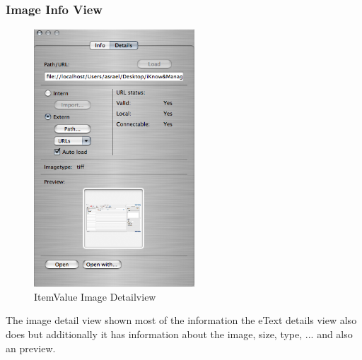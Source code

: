 \documentclass[12pt,a4]{article}
\begin{document}
\subsubsection{Image Info View}
\label{gui_image_info}
\medskip
% 
\begin{figure}[ht]
\begin{center}
\includegraphics[width=6.0cm]{images/ItemValue_Image_DetailView.png}
\end{center}
\caption{ItemValue Image Detailview}
\label{image:itemvalueimagedetail}
\end{figure}
\noindent
%
The image detail view shown most of the information the eText details view also does but additionally it has information about the image, size, type, ... and also an preview.
\end{document}

